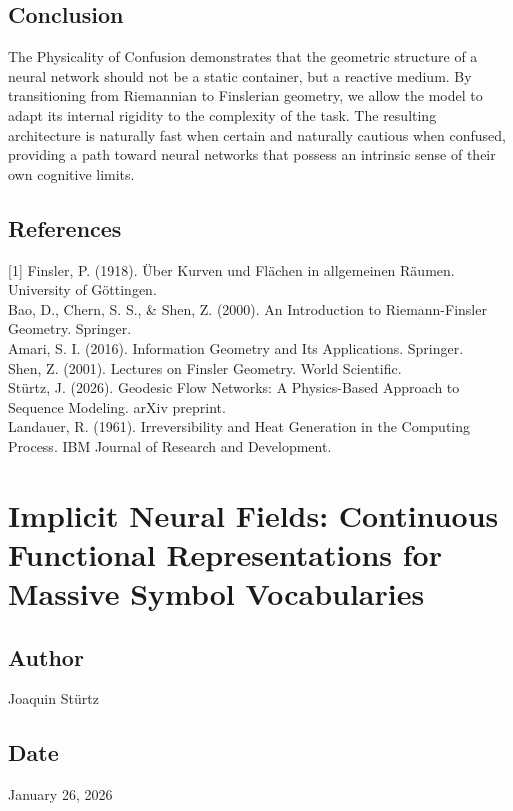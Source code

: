\documentclass{article}
\numberwithin{equation}{section}
\begin{document}
\subsection{Conclusion}
The Physicality of Confusion demonstrates that the geometric structure of a neural network should not be a static container, but a reactive medium. By transitioning from Riemannian to Finslerian geometry, we allow the model to adapt its internal rigidity to the complexity of the task. The resulting architecture is naturally fast when certain and naturally cautious when confused, providing a path toward neural networks that possess an intrinsic sense of their own cognitive limits.

\subsection*{References}
[1] Finsler, P. (1918). Über Kurven und Flächen in allgemeinen Räumen. University of Göttingen.\\
[2] Bao, D., Chern, S. S., \& Shen, Z. (2000). An Introduction to Riemann-Finsler Geometry. Springer.\\
[3] Amari, S. I. (2016). Information Geometry and Its Applications. Springer.\\
[4] Shen, Z. (2001). Lectures on Finsler Geometry. World Scientific.\\
[5] Stürtz, J. (2026). Geodesic Flow Networks: A Physics-Based Approach to Sequence Modeling. arXiv preprint.\\
[6] Landauer, R. (1961). Irreversibility and Heat Generation in the Computing Process. IBM Journal of Research and Development.

\section{Implicit Neural Fields: Continuous Functional Representations for Massive Symbol Vocabularies}
\subsection*{Author}
Joaquin Stürtz
\subsection*{Date}
January 26, 2026
\end{document}
